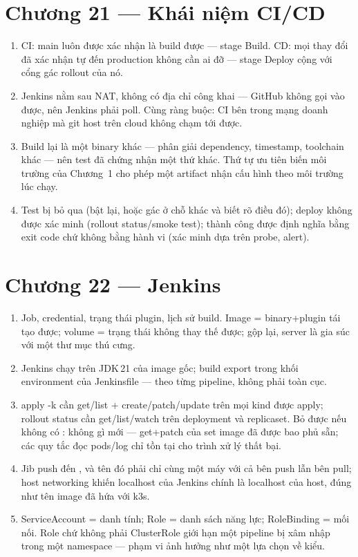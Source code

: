\section*{Chương 21 --- Khái niệm CI/CD}
\begin{enumerate}
  \item CI: main luôn được xác nhận là build được --- stage Build. CD:
  mọi thay đổi đã xác nhận tự đến production không cần ai đỡ --- stage
  Deploy cộng với cổng gác rollout của nó.
  \item Jenkins nằm sau NAT, không có địa chỉ công khai --- GitHub không
  gọi vào được, nên Jenkins phải poll. Cùng ràng buộc: CI bên trong
  mạng doanh nghiệp mà git host trên cloud không chạm tới được.
  \item Build lại là một binary khác --- phân giải dependency, timestamp,
  toolchain khác --- nên test đã chứng nhận một thứ khác. Thứ tự ưu
  tiên biến môi trường của Chương~1 cho phép một artifact nhận cấu
  hình theo môi trường lúc chạy.
  \item Test bị bỏ qua (bật lại, hoặc gác ở chỗ khác và biết rõ điều
  đó); deploy không được xác minh (rollout status/smoke test); thành
  công được định nghĩa bằng exit code chứ không bằng hành vi (xác minh
  dựa trên probe, alert).
\end{enumerate}

\section*{Chương 22 --- Jenkins}
\begin{enumerate}
  \item Job, credential, trạng thái plugin, lịch sử build. Image =
  binary+plugin tái tạo được; volume = trạng thái không thay thế được;
  gộp lại, server là gia súc với một thư mục thú cưng.
  \item Jenkins chạy trên JDK\,21 của image gốc; build export
   trong khối environment của Jenkinsfile
  --- theo từng pipeline, không phải toàn cục.
  \item apply -k cần get/list + create/patch/update trên mọi kind được
  apply; rollout status cần get/list/watch trên deployment và
  replicaset. Bỏ được nếu không có : không gì mới ---
  get+patch của set image đã được bao phủ sẵn; các quy tắc đọc pods/log
  chỉ tồn tại cho trình xử lý thất bại.
  \item Jib push đến , và tên đó phải chỉ cùng
  một máy với cả bên push lẫn bên pull; host networking khiến
  localhost của Jenkins chính là localhost của host, đúng như tên
  image đã hứa với k3s.
  \item ServiceAccount = danh tính; Role = danh sách năng lực;
  RoleBinding = mối nối. Role chứ không phải ClusterRole giới hạn một
  pipeline bị xâm nhập trong một namespace --- phạm vi ảnh hưởng như
  một lựa chọn về kiểu.
\end{enumerate}

